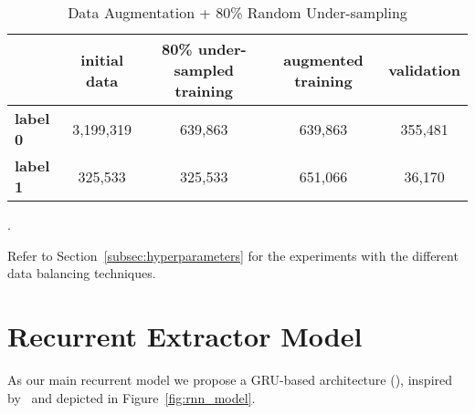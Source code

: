 \begin{enumerate}
\begin{table}[ht]
        \centering
        \begin{tabular}{lcccc}
        \toprule
            & \textbf{initial data} & \textbf{80\% under-sampled training} & \textbf{augmented training} & \textbf{validation} \\
        \midrule
            \textbf{label 0} & 3,199,319 & 639,863 & 639,863 & 355,481 \\
            \textbf{label 1} & 325,533 & 325,533 & 651,066 & 36,170 \\
        \end{tabular}
        \caption{Data Augmentation + 80\% Random Under-sampling}\label{tab:data_augmentation}
    \end{table}
\end{enumerate}.

Refer to Section~\ref{subsec:hyperparameters} for the experiments with the different data balancing techniques.


\section{Recurrent Extractor Model}\label{sec:rnn_model}
As our main recurrent model we propose a GRU-based architecture (\cite{cho-etal-2014-learning}), inspired by~\cite{zmandar-etal-2021-joint} and depicted in Figure~\ref{fig:rnn_model}. \\

